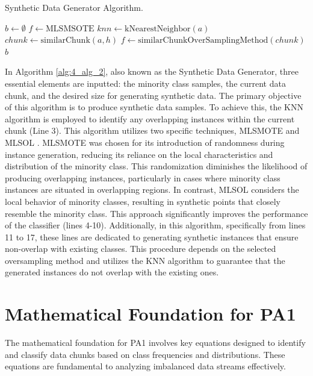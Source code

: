 \begin{algorithm}[H]
	\caption{Synthetic Data Generator Algorithm.}
	\label{alg:4_alg_2}
	$b \gets \emptyset$\;
	$f \gets \text{MLSMSOTE}$\;
	$knn \gets \text{kNearestNeighbor}(a)$\;
	$chunk \gets \text{similarChunk}(a, h)$\;
	$f \gets \text{similarChunkOverSamplingMethod}(chunk)$\;
	\Return $b$\;
	\end{algorithm}
In Algorithm \ref{alg:4_alg_2}, also known as the Synthetic Data Generator, three essential elements are inputted: the minority class samples, the current data chunk, and the desired size for generating synthetic data. The primary objective of this algorithm is to produce synthetic data samples. To achieve this, the KNN algorithm is employed to identify any overlapping instances within the current chunk (Line 3). This algorithm utilizes two specific techniques, MLSMOTE \cite{gama2004learning} and MLSOL \cite{liu2017regional}. MLSMOTE was chosen for its introduction of randomness during instance generation, reducing its reliance on the local characteristics and distribution of the minority class. This randomization diminishes the likelihood of producing overlapping instances, particularly in cases where minority class instances are situated in overlapping regions. In contrast, MLSOL considers the local behavior of minority classes, resulting in synthetic points that closely resemble the minority class. This approach significantly improves the performance of the classifier (lines 4-10). Additionally, in this algorithm, specifically from lines 11 to 17, these lines are dedicated to generating synthetic instances that ensure non-overlap with existing classes. This procedure depends on the selected oversampling method and utilizes the KNN algorithm to guarantee that the generated instances do not overlap with the existing ones.


	\section{Mathematical Foundation for PA1}
	\label{sec:math_foundation_pa1}
	
	The mathematical foundation for PA1 involves key equations designed to identify and classify data chunks based on class frequencies and distributions. These equations are fundamental to analyzing imbalanced data streams effectively.
	
